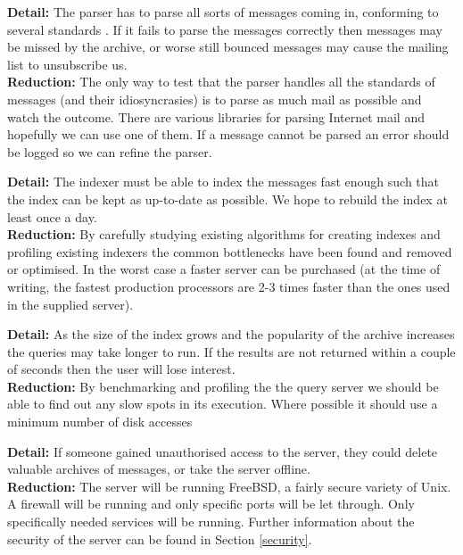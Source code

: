 \textbf{Detail:} The parser has to parse all sorts of messages coming in, conforming to several standards \cite{RFC0822, RFC2045, RFC2046, RFC2047, RFC1896}.  If it fails to parse the messages correctly then messages may be missed by the archive, or worse still bounced messages may cause the mailing list to unsubscribe us.
\\
\textbf{Reduction:} The only way to test that the parser handles all the standards of messages (and their idiosyncrasies) is to parse as much mail as possible and watch the outcome.  There are various libraries for parsing Internet mail and hopefully we can use one of them.  If a message cannot be parsed an error should be logged so we can refine the parser.
\vspace{3mm}

\textbf{Detail:} The indexer must be able to index the messages fast enough such that the index can be kept as up-to-date as possible.  We hope to rebuild the index at least once a day.
\\
\textbf{Reduction:} By carefully studying existing algorithms for creating indexes and profiling existing indexers the common bottlenecks have been found and removed or optimised.  In the worst case a faster server can be purchased (at the time of writing, the fastest production processors are 2-3 times faster than the ones used in the supplied server).
\vspace{3mm}

\textbf{Detail:} As the size of the index grows and the popularity of the archive increases the queries may take longer to run.  If the results are not returned within a couple of seconds then the user will lose interest.
\\
\textbf{Reduction:} By benchmarking and profiling the the query server we should be able to find out any slow spots in its execution.  Where possible it should use a minimum number of disk accesses
\vspace{3mm}

\textbf{Detail:} If someone gained unauthorised access to the server, they could delete valuable archives of messages, or take the server offline.
\\
\textbf{Reduction:} The server will be running FreeBSD, a fairly secure variety of Unix.  A firewall will be running and only specific ports will be let through.  Only specifically needed services will be running.  Further information about the security of the server can be found in Section \ref{security}.

